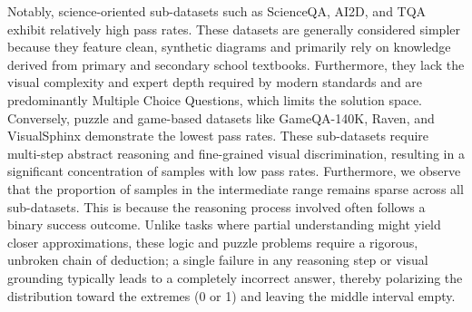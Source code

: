 Notably, science-oriented sub-datasets such as ScienceQA, AI2D, and TQA exhibit relatively high pass rates. These datasets are generally considered simpler because they feature clean, synthetic diagrams and primarily rely on knowledge derived from primary and secondary school textbooks. Furthermore, they lack the visual complexity and expert depth required by modern standards and are predominantly Multiple Choice Questions, which limits the solution space. Conversely, puzzle and game-based datasets like GameQA-140K, Raven, and VisualSphinx demonstrate the lowest pass rates. These sub-datasets require multi-step abstract reasoning and fine-grained visual discrimination, resulting in a significant concentration of samples with low pass rates. Furthermore, we observe that the proportion of samples in the intermediate range remains sparse across all sub-datasets. This is because the reasoning process involved often follows a binary success outcome. Unlike tasks where partial understanding might yield closer approximations, these logic and puzzle problems require a rigorous, unbroken chain of deduction; a single failure in any reasoning step or visual grounding typically leads to a completely incorrect answer, thereby polarizing the distribution toward the extremes (0 or 1) and leaving the middle interval empty.


